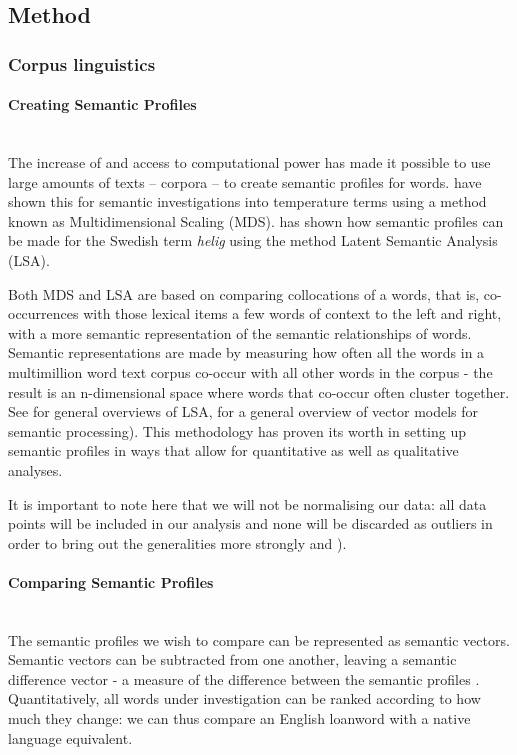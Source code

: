 \documentclass[a4paper]{article}
\begin{document}

\subsection{Method}


\subsubsection{Corpus linguistics}

\paragraph{Creating Semantic Profiles} \hspace{0pt} \\
The increase of and access to computational power has made it possible to use large amounts of texts -- corpora -- to create semantic profiles for words. \citet{Koptjevskaja-Tamm} have shown this for semantic investigations into temperature terms using a method known as Multidimensional Scaling (MDS). \citet{Sikstrom2012} has shown how semantic profiles can be made for the Swedish term \textit{helig} using the method Latent Semantic Analysis (LSA). 

Both MDS and LSA are based on comparing collocations of a words, that is, co-occurrences with those lexical items a few words of context to the left and right, with a more semantic representation of the semantic relationships of words. 
Semantic representations are made by measuring how often all the words in a multimillion word text corpus co-occur with all other words in the corpus - the result is an n-dimensional space where words that co-occur often cluster together. See \citet{Deerwester1990,Dumais2004} for general overviews of LSA, \citet{Turney2010} for a general overview of vector models for semantic processing). This methodology has proven its worth in setting up semantic profiles in ways that allow for quantitative as well as qualitative analyses.

It is important to note here that we will not be normalising our data: all data points will be included in our analysis and none will be discarded as outliers in order to bring out the generalities more strongly \citep[cf.][p.678]{Walchli2012} and \citet[p.293]{Bernardini2002}).

\paragraph{Comparing Semantic Profiles} \hspace{0pt} \\
The semantic profiles we wish to compare can be represented as semantic vectors. Semantic vectors can be subtracted from one another, leaving a semantic difference vector - a measure of the difference between the semantic profiles \citep[cf.][p.19]{Sikstrom2012}. Quantitatively, all words under investigation can be ranked according to how much they change: we can thus compare an English loanword with a native language equivalent. 
\end{document}
